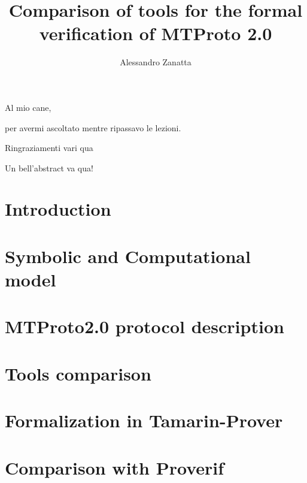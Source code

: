 \documentclass[target=bach,aauheader=]{thud}
\title{Comparison of tools for the formal verification of MTProto 2.0}
\author{Alessandro Zanatta}
\begin{document}
\maketitle

\begin{dedication}
  Al mio cane,\par per avermi ascoltato mentre ripassavo le lezioni.
\end{dedication}

\acknowledgements
Ringraziamenti vari qua

\abstract
Un bell'abstract va qua!

\tableofcontents



\mainmatter

\chapter{Introduction}


\chapter{Symbolic and Computational model}


\chapter{MTProto2.0 protocol description}


\chapter{Tools comparison}


\chapter{Formalization in Tamarin-Prover}


\chapter{Comparison with Proverif}



\backmatter




\end{document}
